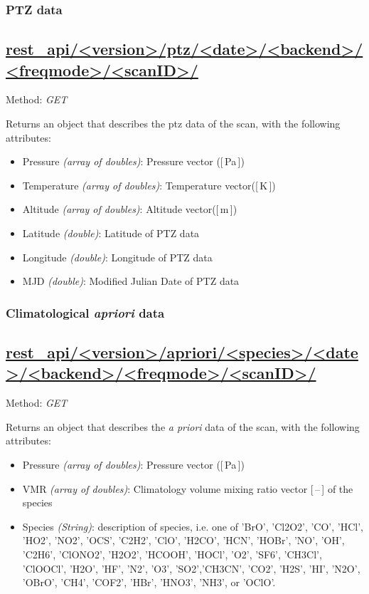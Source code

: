 


\subsubsection{PTZ data}
\subsection*{\url{rest_api/<version>/ptz/<date>/<backend>/<freqmode>/<scanID>/}}
Method: \emph{GET}

Returns an object that describes the ptz data of the scan,
with the following attributes:

\begin{itemize}
    \item Pressure \emph{(array of doubles)}: Pressure vector ([\,Pa\,])
    \item Temperature \emph{(array of doubles)}: Temperature vector([\,K\,])
    \item Altitude \emph{(array of doubles)}:  Altitude vector([\,m\,])
    \item Latitude \emph{(double)}: Latitude of PTZ data
    \item Longitude \emph{(double)}: Longitude of PTZ data
    \item MJD \emph{(double)}: Modified Julian Date of PTZ data

\end{itemize}

\subsubsection{Climatological \textit{apriori} data}
\subsection*{\url{rest_api/<version>/apriori/<species>/<date>/<backend>/<freqmode>/<scanID>/}}
Method: \emph{GET}

Returns an object that describes the \textit{a priori} data of the scan,
with the following attributes:

\begin{itemize}
    \item Pressure \emph{(array of doubles)}: Pressure vector ([\,Pa\,])
    \item VMR \emph{(array of doubles)}: Climatology volume mixing ratio vector [\,--\,] of the species
    \item Species \emph{(String)}: description of species, i.e. one of 'BrO', 'Cl2O2', 'CO',
          'HCl', 'HO2', 'NO2', 'OCS', 'C2H2', 'ClO', 'H2CO', 'HCN', 'HOBr', 'NO', 'OH', 'C2H6',
          'ClONO2', 'H2O2', 'HCOOH', 'HOCl', 'O2', 'SF6', 'CH3Cl', 'ClOOCl', 'H2O', 'HF', 'N2', 'O3',
          'SO2','CH3CN', 'CO2', 'H2S', 'HI', 'N2O', 'OBrO', 'CH4', 'COF2', 'HBr', 'HNO3', 'NH3', or 'OClO'.
\end{itemize}

